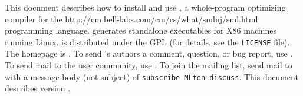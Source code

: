 This document describes how to install and use {\mlton}, a
whole-program optimizing compiler for the
		  {http://cm.bell-labs.com/cm/cs/what/smlnj/sml.html}
programming language.
{\mlton} generates standalone executables for X86
machines running Linux.
{\mlton} is distributed under the GPL (for details, see the 
{\tt LICENSE} file).
The {\mlton} homepage is \absolutelink{}.
To send {\mlton}'s authors a comment, question, or bug report, use
\mltonmail.
To send mail to the {\mlton} user community, use
.
To join the {\mlton} mailing list, send mail to
 with a message body (not subject) of
{\tt subscribe MLton-discuss}.
This document describes {\mlton} version {\version}.

